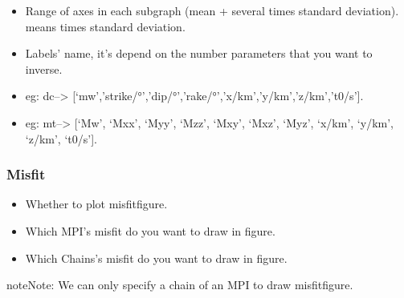 \documentclass[a4paper,10pt,english,openany]{sphinxmanual}
\begin{document}
\begin{itemize}
\item {} 
Range of axes in each subgraph (mean +\sphinxhyphen{} several times standard deviation).  means  times standard deviation.

\end{itemize}

\begin{itemize}
\item {} 
Labels’ name, it’s depend on the number parameters that you want to inverse.

\item {} 
eg: dc–> {[}‘mw’,’strike/°’,’dip/°’,’rake/°’,’x/km’,’y/km’,’z/km’,’t0/s’{]}.

\item {} 
eg: mt–> {[}‘Mw’,  ‘Mxx’,  ‘Myy’,  ‘Mzz’,  ‘Mxy’,  ‘Mxz’,  ‘Myz’, ‘x/km’, ‘y/km’, ‘z/km’, ‘t0/s’{]}.

\end{itemize}


\subsubsection{Misfit}
\label{\detokenize{tutorials/S5_Plot_Result:misfit}}
\begin{itemize}
\item {} 
Whether to plot misfit\sphinxhyphen{}figure.

\end{itemize}

\begin{itemize}
\item {} 
Which MPI’s misfit do you want to draw in figure.

\end{itemize}

\begin{itemize}
\item {} 
Which Chains’s misfit do you want to draw in figure.

\end{itemize}

\begin{sphinxadmonition}{note}{Note:}
We can only specify a chain of an MPI to draw misfit\sphinxhyphen{}figure.
\end{sphinxadmonition}
\end{document}

